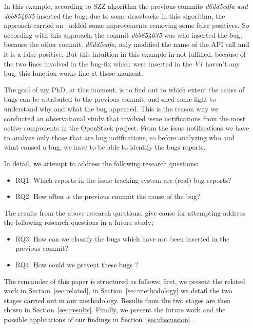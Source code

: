\documentclass[ifip]{svmult}
\begin{document}
In this example, according to SZZ algorithm the previous commits \textit{d6dd5cdfa and dbb854635} inserted the bug; due to some drawbacks in this algorithm, the approach carried on~\cite{kim2006automatic} added some improvements removing some false positives. So according with this approach, the commit \textit{dbb854635} was who inserted the bug, because the other commit, \textit{d6dd5cdfa}, only modified the name of the API call and it is a false positive. But this intuition in this example in not fulfilled, because of the two lines involved in the bug-fix which were inserted in the \textit{V1} haven't any bug, this function works fine at these moment. 

The goal of my PhD, at this moment, is to find out to which extent the cause of bugs can be attributed to the previous commit, and shed some light to understand why and what the bug appeared.  This is the reason why we conducted an observational study that involved issue notifications from the most active components in the OpenStack project. From the issue notifications we have to analyze only those that are bug notifications, so before analyzing who and what caused a bug, we have to be able to identify the bugs reports. 

In detail, we attempt to address the following research questions:
\begin{itemize}
    \item RQ1:  Which reports in the issue tracking system are (real) bug reports?
    \item RQ2:  How often is the previous commit the cause of the bug?
\end{itemize}

The results from  the above research questions, give cause for attempting address the following research questions in a future study;  
\begin{itemize}
    \item RQ3:  How can we classify the bugs which have not been inserted in the previous commit?
    \item RQ4:  How could we prevent these bugs ?
\end{itemize}

The remainder of this paper is structured as follows; first, we present the related work in Section~\ref{sec:related}, in Section~\ref{sec:methodology} we detail the two stages carried out in our methodology. Results from the two stages are then shown in Section~\ref{sec:results}. Finally, we present the future work and the possible applications of our findings in Section~\ref{sec:discussion} .
\end{document}
